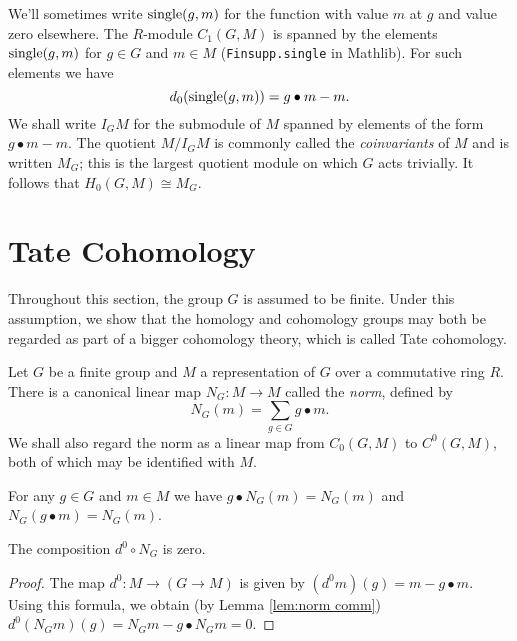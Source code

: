 \begin{example}
	We'll sometimes write $\mathrm{single}(g,m)$ for the function with value $m$ at $g$ and value
	zero elsewhere. The $R$-module $C_1(G,M)$ is spanned by the elements $\mathrm{single}(g,m)$
	for $g \in G$ and $m \in M$ (\texttt{Finsupp.single} in Mathlib).
	For such elements we have
	\[
		d_0(\mathrm{single}(g,m))
		=
		g \bullet m - m.
	\]
	We shall write $I_G M$ for the submodule of $M$ spanned by elements of the form $g \bullet m - m$.
	The quotient $M / I_GM$ is commonly called the \emph{coinvariants} of $M$ and is written $M_G$;
	this is the largest	quotient module on which $G$ acts trivially.
	It follows that $H_0(G,M) \cong M_G$.
\end{example}



\section{Tate Cohomology}

Throughout this section, the group $G$ is assumed to be finite.
Under this assumption, we show that the homology and cohomology groups
may both be regarded as part of a bigger cohomology theory, which is called Tate cohomology.

\begin{definition} \label{def:norm}
	Let $G$ be a finite group and $M$ a representation of $G$ over a commutative ring $R$.
	There is a canonical linear map $N_G : M \to M$ called the \emph{norm},
	defined by
	\[
		N_G(m) = \sum_{g \in G} g \bullet m.
	\]
	We shall also regard the norm as a linear map from $C_0(G,M)$ to $C^0(G,M)$, both of which may
	be identified with $M$.
\end{definition}

\begin{lemma}	\label{lem:norm comm}
	\leanok
	For any $g \in G$ and $m \in M$ we have $g \bullet N_G (m) = N_G (m)$
	and $N_G (g \bullet m) = N_G (m)$.
\end{lemma}

\begin{lemma}	\label{lem:norm comp d}
	\leanok
	The composition $d^0 \circ N_G$ is zero.
\end{lemma}

\begin{proof}
	The map $d^0 : M \to (G \to M)$ is given by
	$(d^0 m)(g) = m - g\bullet m$.
	Using this formula, we obtain (by Lemma \ref{lem:norm comm})
	$d^0 (N_G m) (g) = N_G m - g \bullet N_G m = 0$.
\end{proof}

